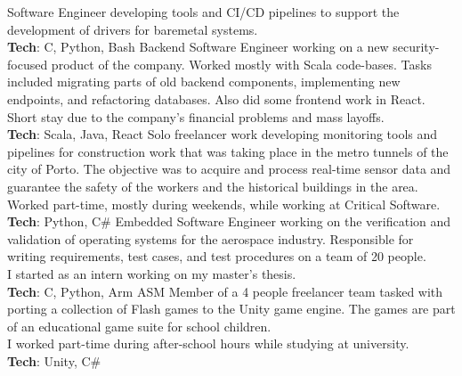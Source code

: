 \documentclass[letterpaper]{twentysecondcv} %
\begin{document}
\begin{twenty}
    {Software Engineer developing tools and CI/CD pipelines to support
    the development of drivers for baremetal systems.\\
    \textbf{Tech}: C, Python, Bash}
    {Backend Software Engineer working on a new security-focused product of
    the company. Worked mostly with Scala code-bases. Tasks included
    migrating parts of old backend components, implementing new endpoints, and
    refactoring databases. Also did some frontend work in React.\\
    Short stay due to the company's financial problems and mass layoffs.\\
    \textbf{Tech}: Scala, Java, React}
    {Solo freelancer work developing monitoring tools and pipelines for
    construction work that was taking place in the metro tunnels of the city of
    Porto. The objective was to acquire and process real-time sensor data and
    guarantee the safety of the workers and the historical buildings in the area.\\
    Worked part-time, mostly during weekends, while working at Critical Software.\\
    \textbf{Tech}: Python, C\#}
    {Embedded Software Engineer working on the verification and validation of
    operating systems for the aerospace industry. Responsible for writing
    requirements, test cases, and test procedures on a team of 20 people.\\
    I started as an intern working on my master's thesis.\\
    \textbf{Tech}: C, Python, Arm ASM}
    {Member of a 4 people freelancer team tasked with porting a collection of Flash games to the Unity game engine. The games are part of an educational game suite for school children.\\
    I worked part-time during after-school hours while studying at university.\\
    \textbf{Tech}: Unity, C\#}
\end{twenty}

\vfill

\end{document}
